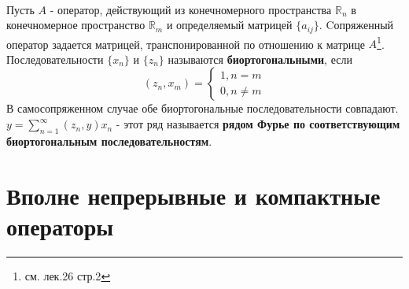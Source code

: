 \documentclass{article}
\begin{document}
	\\
	Пусть $A$ - оператор, действующий из конечномерного
	пространства ${\mathbb{R}}_{n}$ в конечномерное пространство ${\mathbb{R}}_{m}$ и определяемый матрицей $\{{a}_{ij}\}$. Cопряженный
	оператор задается матрицей, транспонированной по отношению к матрице
	$A$\footnote{см. лек.26 стр.2}.\\
	Последовательности $\{{x}_{n}\}$ и $\{{z}_{n}\}$ называются \textbf{биортогональными}, если 
	\begin{equation}
	({z}_{n},{x}_{m})=\left\{\begin{array}{l}1, n=m\\ 0, n\ne m\end{array}\right. 
	\end{equation}
	В самосопряженном случае обе биортогональные последовательности совпадают. $y=\sum_{n=1}^{\infty} ({z}_{n},y){x}_{n}$ - этот ряд называется \textbf{рядом Фурье по соответствующим биортогональным
	последовательностям}.\\
\section{Вполне непрерывные и компактные операторы}
\end{document}
